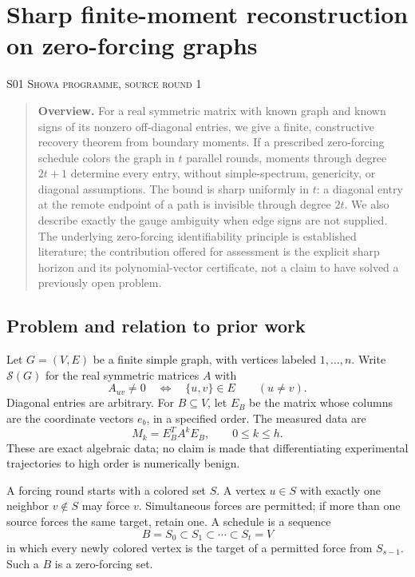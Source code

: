 \documentclass[11pt,a4paper]{article}
\theoremstyle{definition}\newtheorem{definition}[theorem]{Definition}
\theoremstyle{remark}\newtheorem{remark}[theorem]{Remark}
\numberwithin{equation}{section}
\begin{document}
\clearpage
\section[S01 --- Sharp finite-moment reconstruction on zero-forcing graphs]{Sharp finite-moment reconstruction on zero-forcing graphs}\label{contrib-S01}
\noindent\textsc{S01 \quad Showa programme, source round 1}\par\medskip



\begin{quote}\small\textbf{Overview.} For a real symmetric matrix with known graph and known signs of its nonzero off-diagonal entries, we give a finite, constructive recovery theorem from boundary moments. If a prescribed zero-forcing schedule colors the graph in $t$ parallel rounds, moments through degree $2t+1$ determine every entry, without simple-spectrum, genericity, or diagonal assumptions. The bound is sharp uniformly in $t$: a diagonal entry at the remote endpoint of a path is invisible through degree $2t$. We also describe exactly the gauge ambiguity when edge signs are not supplied. The underlying zero-forcing identifiability principle is established literature; the contribution offered for assessment is the explicit sharp horizon and its polynomial-vector certificate, not a claim to have solved a previously open problem.\end{quote}

\subsection{Problem and relation to prior work}\label{S01-sec-1}
Let $G=(V,E)$ be a finite simple graph, with vertices labeled $1,\ldots,n$. Write $\mathcal S(G)$ for the real symmetric matrices $A$ with
\[
 A_{uv}\ne0\quad\Longleftrightarrow\quad\{u,v\}\in E\qquad(u\ne v).
\]
Diagonal entries are arbitrary. For $B\subseteq V$, let $E_B$ be the matrix whose columns are the coordinate vectors $e_b$, in a specified order. The measured data are
\begin{equation}\label{S01-eq:moments}
 M_k=E_B^{T}A^kE_B,\qquad 0\le k\le h.
\end{equation}
These are exact algebraic data; no claim is made that differentiating experimental trajectories to high order is numerically benign.

A forcing round starts with a colored set $S$. A vertex $u\in S$ with exactly one neighbor $v\notin S$ may force $v$. Simultaneous forces are permitted; if more than one source forces the same target, retain one. A schedule is a sequence
\[
 B=S_0\subset S_1\subset\cdots\subset S_t=V
\]
in which every newly colored vertex is the target of a permitted force from $S_{s-1}$. Such a $B$ is a zero-forcing set.
\end{document}
